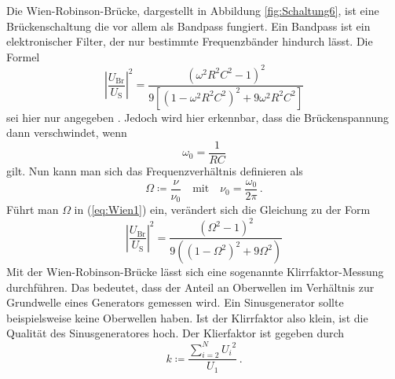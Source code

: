 Die Wien-Robinson-Brücke, dargestellt in Abbildung \ref{fig:Schaltung6}, ist eine Brückenschaltung
die vor allem als Bandpass fungiert. 
Ein Bandpass ist ein elektronischer Filter, der  nur bestimmte Frequenzbänder hindurch lässt.
Die Formel
\begin{equation} \label{eq:Wien1}
    \left|\frac{U_\text{Br}}{U_\text{S}}\right|^2 =  \frac{\left({\omega}^2 R^2 C^2 -1 \right)^2}
    {9 \left[ \left( 1 - {\omega}^2 R^2 C^2 \right)^2 + 9 {\omega}^2 R^2 C^2 \right]}
\end{equation}
sei hier nur angegeben \cite[9]{v302}.
Jedoch wird hier erkennbar, dass die Brückenspannung dann verschwindet, wenn
\begin{equation*}
    \omega_0 = \frac{1}{R C}
\end{equation*}
gilt. Nun kann man sich das Frequenzverhältnis definieren als
\begin{equation*}
    \Omega \coloneq \frac{\nu}{\nu_0} \quad \text{mit} \quad \nu_0 = \frac{\omega_0}{2\pi} \, .
\end{equation*}
Führt man $\Omega$ in (\ref{eq:Wien1}) ein, verändert sich die Gleichung zu der Form
\begin{equation} \label{eq:Wien2}
    \left|\frac{U_\text{Br}}{U_\text{S}}\right|^2 = \frac{\left( \Omega^2 -1 \right)^2}
    {9 \left( \left( 1 - \Omega^2 \right)^2 + 9 \Omega^2 \right)}
\end{equation}
Mit der Wien-Robinson-Brücke lässt sich eine sogenannte Klirrfaktor-Messung durchführen.
Das bedeutet, dass der Anteil an Oberwellen im Verhältnis zur Grundwelle eines Generators gemessen wird.
Ein Sinusgenerator sollte beispielsweise keine Oberwellen haben.
Ist der Klirrfaktor also klein, ist die Qualität des Sinusgeneratores hoch.
Der Klierfaktor ist gegeben durch
\begin{equation} \label{eq:klirr}
    k \coloneq \frac {\sum_{i=2}^{N} {U_i}^2}{U_1}  \, .
\end{equation}